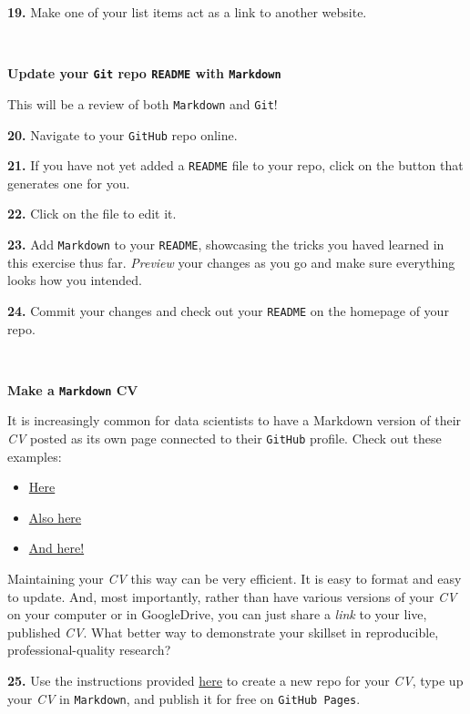 \documentclass[
]{book}
\providecommand{\tightlist}{%
  \setlength{\itemsep}{0pt}\setlength{\parskip}{0pt}}
\begin{document}
\textbf{19.} Make one of your list items act as a link to another website.

~

\textbf{Update your \texttt{Git} repo \texttt{README} with \texttt{Markdown}}

This will be a review of both \texttt{Markdown} and \texttt{Git}!

\textbf{20.} Navigate to your \texttt{GitHub} repo online.

\textbf{21.} If you have not yet added a \texttt{README} file to your repo, click on the button that generates one for you.

\textbf{22.} Click on the file to edit it.

\textbf{23.} Add \texttt{Markdown} to your \texttt{README}, showcasing the tricks you haved learned in this exercise thus far. \emph{Preview} your changes as you go and make sure everything looks how you intended.

\textbf{24.} Commit your changes and check out your \texttt{README} on the homepage of your repo.

~

\textbf{Make a \texttt{Markdown} CV}

It is increasingly common for data scientists to have a Markdown version of their \emph{CV} posted as its own page connected to their \texttt{GitHub} profile. Check out these examples:

\begin{itemize}
\tightlist
\item
  \href{https://carolstran.github.io/cv/}{Here}\\
\item
  \href{https://github.com/ViliamV/easy-markdown-cv}{Also here}\\
\item
  \href{http://wodenimoni.com/nimo-markdown-cv/}{And here!}
\end{itemize}

Maintaining your \emph{CV} this way can be very efficient. It is easy to format and easy to update. And, most importantly, rather than have various versions of your \emph{CV} on your computer or in GoogleDrive, you can just share a \emph{link} to your live, published \emph{CV}. What better way to demonstrate your skillset in reproducible, professional-quality research?

\textbf{25.} Use the instructions provided \href{https://workwithcarolyn.com/blog/digital-cv-guide}{here} to create a new repo for your \emph{CV}, type up your \emph{CV} in \texttt{Markdown}, and publish it for free on \texttt{GitHub\ Pages}.
\end{document}
